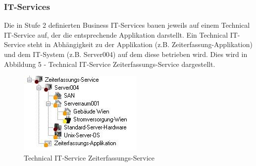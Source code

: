 \subsubsection{IT-Services}
Die in Stufe 2 definierten Business IT-Services bauen jeweils auf einem Technical IT-Service auf, der die entsprechende Applikation darstellt. Ein Technical IT-Service steht in Abhängigkeit zu der Applikation (z.B. Zeiterfassung-Applikation) und dem IT-System (z.B. Server004) auf dem diese betrieben wird. Dies wird in Abbildung 5 - Technical IT-Service Zeiterfassungs-Service dargestellt.
\newpage
\begin{figure}[htbp]
	\centering
	\includegraphics[scale =1 ]{images/Technical.png}
	\caption{Technical IT-Service Zeiterfassungs-Service}
	\label{fig:bsp}
\end{figure}
